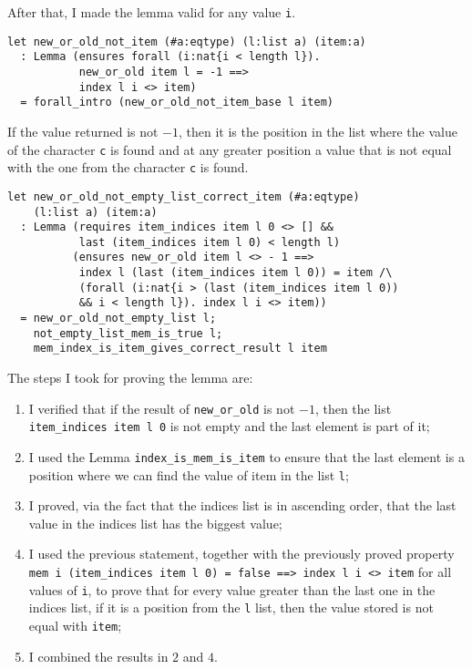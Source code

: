 After that, I made the lemma valid for any value \texttt{i}.

\begin{verbatim}
let new_or_old_not_item (#a:eqtype) (l:list a) (item:a)
  : Lemma (ensures forall (i:nat{i < length l}).
           new_or_old item l = -1 ==> 
           index l i <> item)
  = forall_intro (new_or_old_not_item_base l item)
\end{verbatim}

If the value returned is not \(-1\), then it is the position in the list where the value of the character \texttt{c} is found and at any greater position a value that is not equal with the one from the character \texttt{c} is found.

\begin{verbatim}
let new_or_old_not_empty_list_correct_item (#a:eqtype) 
    (l:list a) (item:a)
  : Lemma (requires item_indices item l 0 <> [] &&
           last (item_indices item l 0) < length l)
          (ensures new_or_old item l <> - 1 ==> 
           index l (last (item_indices item l 0)) = item /\
           (forall (i:nat{i > (last (item_indices item l 0))
           && i < length l}). index l i <> item))
  = new_or_old_not_empty_list l;
    not_empty_list_mem_is_true l;
    mem_index_is_item_gives_correct_result l item
\end{verbatim}

The steps I took for proving the lemma are:
\begin{enumerate}
\item I verified that if the result of \texttt{new\_or\_old} is not \(-1\), then the list \texttt{item\_indices item l 0} is not empty and the last element is part of it;
\item I used the Lemma \texttt{index\_is\_mem\_is\_item} to ensure that the last element is a position where we can find the value of item in the list \texttt{l};
\item I proved, via the fact that the indices list is in ascending order, that the last value in the indices list has the biggest value;
\item I used the previous statement, together with the previously proved property \texttt{mem i (item\_indices item l 0) = false ==> index l i <> item} for all values of \texttt{i}, to prove that for every value greater than the last one in the indices list, if it is a position from the \texttt{l} list, then the value stored is not equal with \texttt{item};
\item I combined the results in \(2\) and \(4\).
\end{enumerate}

